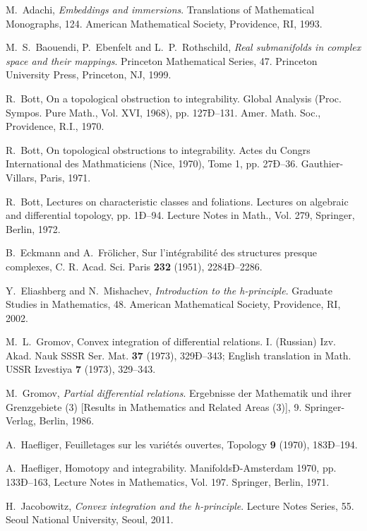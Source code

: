 \documentclass{amsart}
\begin{document}
\begin{thebibliography}{xx}

M.~Adachi,
\textsl{Embeddings and immersions}. 
Translations of Mathematical Monographs, 124. 
American Mathematical Society, Providence, RI, 1993.

M.~S.~Baouendi, P.~Ebenfelt and L.~P.~Rothschild, 
\textsl{Real submanifolds in complex space and their mappings}. 
Princeton Mathematical Series, 47. Princeton University Press, Princeton, NJ, 1999. 

R.~Bott,
On a topological obstruction to integrability.   
Global Analysis (Proc. Sympos. Pure Math., Vol. XVI, 1968), 
pp. 127Ð--131. Amer. Math. Soc., Providence, R.I., 1970.

R.~Bott,
On topological obstructions to integrability. 
Actes du Congrs International des Mathmaticiens (Nice, 1970), Tome 1, pp. 27Ð--36.
Gauthier-Villars, Paris, 1971. 

R.~Bott, 
Lectures on characteristic classes and foliations. 
Lectures on algebraic and differential topology, pp. 1Ð--94. 
Lecture Notes in Math., Vol. 279, Springer, Berlin, 1972.

B.~Eckmann and A.~Fr\"olicher,
Sur l'int\'egrabilit\'e des structures presque complexes, 
C. R. Acad. Sci. Paris \textbf{232} (1951), 2284Ð--2286.

Y.~Eliashberg and N.~Mishachev, 
\textsl{Introduction to the h-principle}. 
Graduate Studies in Mathematics, 48. American Mathematical Society, Providence, RI, 2002. 
 

 M.~L.~Gromov, 
Convex integration of differential relations. I. (Russian) 
Izv. Akad. Nauk SSSR Ser. Mat. \textbf{37} (1973), 329Ð--343;
English translation in Math. USSR Izvestiya \textbf{7} (1973), 329--343.

M.~Gromov, 
\textsl{Partial differential relations}. 
Ergebnisse der Mathematik und ihrer Grenzgebiete (3) [Results in Mathematics and Related Areas (3)], 9. Springer-Verlag, Berlin, 1986. 

A.~Haefliger,  Feuilletages sur les vari\'et\'es ouvertes, 
Topology \textbf 9 (1970), 183Ð--194. 

A.~Haefliger, Homotopy and integrability. ManifoldsÐ-Amsterdam 1970, pp. 133Ð--163, Lecture Notes in Mathematics, Vol. 197. Springer, Berlin, 1971.

H.~Jacobowitz, 
\textsl{Convex integration and the h-principle}. 
Lecture Notes Series, 55. Seoul National University, Seoul, 2011.


\end{thebibliography}
\end{document}
